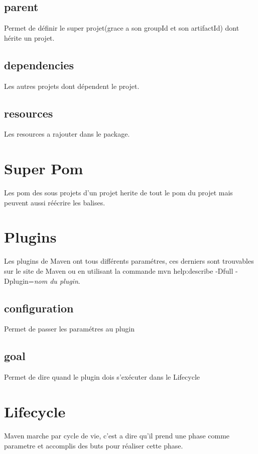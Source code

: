 \documentclass[a4paper,10pt]{article}
\begin{document}
\subsection{parent}
Permet de définir le super projet(grace a son groupId et son artifactId) dont hérite un projet.

\subsection{dependencies}
Les autres projets dont dépendent le projet.

\subsection{resources}
Les resources a rajouter dans le package.

\section{Super Pom}
Les pom des sous projets d'un projet herite de tout le pom du projet mais peuvent aussi réécrire les balises.

\section{Plugins}
Les plugins de Maven ont tous différents paramétres, ces derniers sont trouvables sur le site de Maven ou en utilisant la commande mvn help:describe -Dfull -Dplugin=\textit{nom du plugin}.

\subsection{configuration}
Permet de passer les paramétres au plugin

\subsection{goal}
Permet de dire quand le plugin dois s'exécuter dans le Lifecycle

\section{Lifecycle}
Maven marche par cycle de vie, c'est a dire qu'il prend une phase comme parametre et accomplis des buts pour réaliser cette phase.
\end{document}
